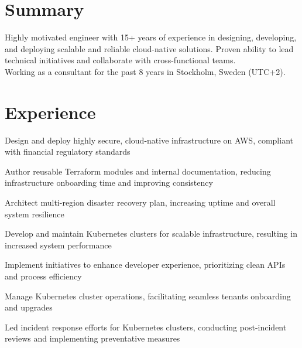 \documentclass[]{willianpaixao-resume}
\begin{document}
\begin{minipage}[t]{0.64\textwidth}

\section{Summary}
Highly motivated engineer with 15+ years of experience in designing, developing, and deploying scalable and reliable cloud-native solutions. Proven ability to lead technical initiatives and collaborate with cross-functional teams.\\
Working as a consultant for the past 8 years in Stockholm, Sweden (UTC+2).

\section{Experience}
\sectionsep
\begin{tightemize}
\item Design and deploy highly secure, cloud-native infrastructure on AWS, compliant with financial regulatory standards
\item Author reusable Terraform modules and internal documentation, reducing infrastructure onboarding time and improving consistency
\end{tightemize}
\sectionsep
{}
\begin{tightemize}
\item Architect multi-region disaster recovery plan, increasing uptime and overall system resilience
\item Develop and maintain Kubernetes clusters for scalable infrastructure, resulting in increased system performance
\end{tightemize}
\sectionsep

\begin{tightemize}
\item Implement initiatives to enhance developer experience, prioritizing clean APIs and process efficiency
\item Manage Kubernetes cluster operations, facilitating seamless tenants onboarding and upgrades
\item Led incident response efforts for Kubernetes clusters, conducting post-incident reviews and implementing preventative measures
\end{tightemize}
\sectionsep


\end{minipage}
\end{document}
